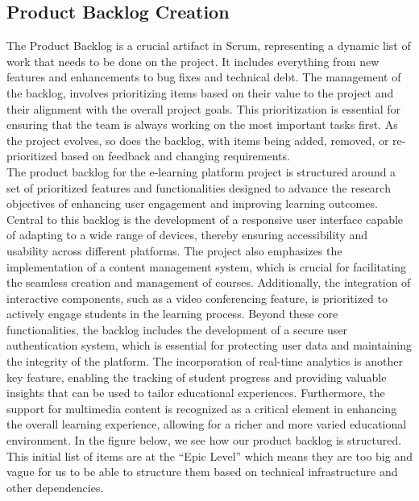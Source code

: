 \documentclass[a4paper,12pt]{article}  %
\begin{document}
\subsection{Product Backlog Creation}
The Product Backlog is a crucial artifact in Scrum, representing a dynamic list
of work that needs to be done on the project. It includes everything from new
features and enhancements to bug fixes and technical debt. The management of
the backlog, involves prioritizing items based on their value to the project
and their alignment with the overall project goals. This prioritization is
essential for ensuring that the team is always working on the most important
tasks first. As the project evolves, so does the backlog, with items being
added, removed, or re-prioritized based on feedback and changing requirements.
\cite{schwaber2020scrum} \\ The product backlog for the e-learning platform
project is structured around a set of prioritized features and functionalities
designed to advance the research objectives of enhancing user engagement and
improving learning outcomes. Central to this backlog is the development of a
responsive user interface capable of adapting to a wide range of devices,
thereby ensuring accessibility and usability across different platforms. The
project also emphasizes the implementation of a content management system,
which is crucial for facilitating the seamless creation and management of
courses. Additionally, the integration of interactive components, such as a
video conferencing feature, is prioritized to actively engage students in the
learning process. Beyond these core functionalities, the backlog includes the
development of a secure user authentication system, which is essential for
protecting user data and maintaining the integrity of the platform. The
incorporation of real-time analytics is another key feature, enabling the
tracking of student progress and providing valuable insights that can be used
to tailor educational experiences. Furthermore, the support for multimedia
content is recognized as a critical element in enhancing the overall learning
experience, allowing for a richer and more varied educational environment. In
the figure below, we see how our product backlog is structured. This initial
list of items are at the “Epic Level” which means they are too big and vague
for us to be able to structure them based on technical infrastructure and other
dependencies. \\
\end{document}
